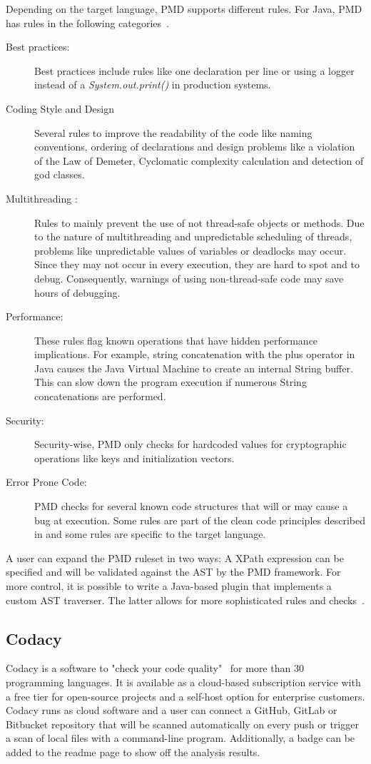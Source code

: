 Depending on the target language, PMD supports different rules. For Java, PMD has rules in the following categories~\cite{noauthor_documentation_nodate}.
\begin{description}
    \item[Best practices:] Best practices include rules like one declaration per line or using a logger instead of a \textit{System.out.print()} in production systems.  
    \item[Coding Style and Design] Several rules to improve the readability of the code like naming conventions, ordering of declarations and design problems like a violation of the Law of Demeter, Cyclomatic complexity calculation and detection of god classes.
    \item[Multithreading :]  Rules to mainly prevent the use of not thread-safe objects or methods. Due to the nature of multithreading and unpredictable scheduling of threads, problems like unpredictable values of variables or deadlocks may occur. Since they may not occur in every execution, they are hard to spot and to debug. Consequently, warnings of using non-thread-safe code may save hours of debugging.
    \item[Performance:] These rules flag known operations that have hidden performance implications. For example, string concatenation with the plus operator in Java causes the Java Virtual Machine to create an internal String buffer. This can slow down the program execution if numerous String concatenations are performed.
    \item[Security:] Security-wise, PMD only checks for hardcoded values for cryptographic operations like keys and initialization vectors.
    \item[Error Prone Code:] PMD checks for several known code structures that will or may cause a bug at execution. Some rules are part of the clean code principles described in  and some rules are specific to the target language.
\end{description}

A user can expand the PMD ruleset in two ways: A XPath expression can be specified and will be validated against the AST by the PMD framework. For more control, it is possible to write a Java-based plugin that implements a custom AST traverser. The latter allows for more sophisticated rules and checks~\cite{noauthor_documentation_nodate}.

\subsection{Codacy}
Codacy is a software to "check your code quality"~\cite{noauthor_codacy_nodate} for more than 30 programming languages. It is available as a cloud-based subscription service with a free tier for open-source projects and a self-host option for enterprise customers.  Codacy runs as cloud software and a user can connect a GitHub, GitLab or Bitbucket repository that will be scanned automatically on every push or trigger a scan of local files with a command-line program. Additionally, a badge can be added to the readme page to show off the analysis results.

